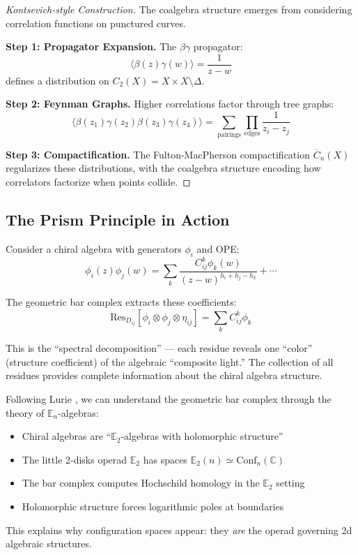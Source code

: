 \begin{proof}[Kontsevich-style Construction]
The coalgebra structure emerges from considering correlation functions on punctured curves.

\textbf{Step 1: Propagator Expansion.} The $\beta\gamma$ propagator:
\[
\langle \beta(z)\gamma(w) \rangle = \frac{1}{z-w}
\]
defines a distribution on $C_2(X) = X \times X \setminus \Delta$.

\textbf{Step 2: Feynman Graphs.} Higher correlations factor through tree graphs:
\[
\langle \beta(z_1)\gamma(z_2)\beta(z_3)\gamma(z_4) \rangle = 
\sum_{\text{pairings}} \prod_{\text{edges}} \frac{1}{z_i - z_j}
\]

\textbf{Step 3: Compactification.} The Fulton-MacPherson compactification $\overline{C}_n(X)$ 
regularizes these distributions, with the coalgebra structure encoding how correlators 
factorize when points collide.
\end{proof}

\subsection{The Prism Principle in Action}

\begin{example}
Consider a chiral algebra with generators $\phi_i$ and OPE:
$$\phi_i(z) \phi_j(w) = \sum_k \frac{C_{ij}^k \phi_k(w)}{(z-w)^{h_i + h_j - h_k}} + \cdots$$

The geometric bar complex extracts these coefficients:
$$\text{Res}_{D_{ij}}[\phi_i \otimes \phi_j \otimes \eta_{ij}] = \sum_k C_{ij}^k \phi_k$$

This is the ``spectral decomposition'' --- each residue reveals one ``color'' (structure coefficient) 
of the algebraic ``composite light.'' The collection of all residues provides complete information about 
the chiral algebra structure.
\end{example}

\begin{remark}
Following Lurie \cite{HA}, we can understand the geometric bar complex through the theory of 
$\mathbb{E}_n$-algebras:

\begin{itemize}
\item Chiral algebras are ``$\mathbb{E}_2$-algebras with holomorphic structure''
\item The little 2-disks operad $\mathbb{E}_2$ has spaces $\mathbb{E}_2(n) \simeq \text{Conf}_n(\mathbb{C})$
\item The bar complex computes Hochschild homology in the $\mathbb{E}_2$ setting
\item Holomorphic structure forces logarithmic poles at boundaries
\end{itemize}

This explains why configuration spaces appear: they \emph{are} the operad governing 2d algebraic structures.
\end{remark}

